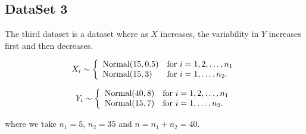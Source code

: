 \documentclass[12]{report}
\begin{document}
        
        


\subsection{DataSet 3}


The third dataset is a dataset where as $X$ increases, the variability in $Y$ increases first and then decreases.

\[ X_i \sim \left\{ \begin{array}{ll}
         \hbox{Normal} (15, 0.5) & \mbox{for $i = 1,2, \dots, n_1$}\\
        \hbox{Normal} (15, 3) & \mbox{for $i = 1,  \dots, n_2$}.\end{array} \right. \]

\[ Y_i \sim \left\{ \begin{array}{ll}
         \hbox{Normal} (40 , 8) & \mbox{for $i = 1,2, \dots, n_1$}\\
        \hbox{Normal}  (15 , 7) & \mbox{for $i = 1, \dots, n_2$}.\end{array} \right. \]
        
 where we take $n_1 = 5$, $n_2 = 35$ and $n = n_1 + n_2 = 40$. \\       
 
\end{document}
